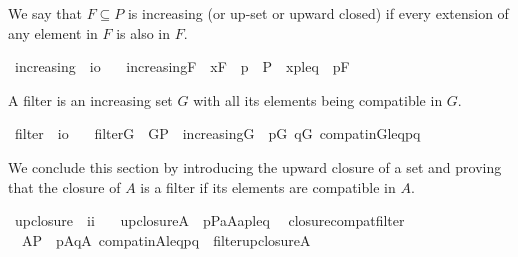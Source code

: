 We say that $F\subseteq P$ is increasing (or up-set or upward closed) if every
extension of any element in $F$ is also in $F$.
\begin{isabelle}
\isamarkupfalse%
\ increasing\ {\isacharcolon}{\isacharcolon}\ {\isachardoublequoteopen}i{\isasymRightarrow}o{\isachardoublequoteclose}\ \isanewline
\ \ {\isachardoublequoteopen}increasing{\isacharparenleft}F{\isacharparenright}\ {\isacharequal}{\isacharequal}\ {\isasymforall}x{\isasymin}F{\isachardot}\ {\isasymforall}\ p\ {\isasymin}\ P\ {\isachardot}\ {\isasymlangle}x{\isacharcomma}p{\isasymrangle}{\isasymin}leq\ {\isasymlongrightarrow}\ p{\isasymin}F{\isachardoublequoteclose}
\end{isabelle}
A filter is an increasing set $G$ with all its elements being compatible in $G$.
\begin{isabelle}
\isamarkupfalse%
\ filter\ {\isacharcolon}{\isacharcolon}\ {\isachardoublequoteopen}i{\isasymRightarrow}o{\isachardoublequoteclose}\ \isanewline
\ \ {\isachardoublequoteopen}filter{\isacharparenleft}G{\isacharparenright}\ {\isacharequal}{\isacharequal}\ G{\isasymsubseteq}P\ {\isasymand}\ increasing{\isacharparenleft}G{\isacharparenright}\ {\isasymand}\ {\isacharparenleft}{\isasymforall}p{\isasymin}G{\isachardot}\ {\isasymforall}q{\isasymin}G{\isachardot}\ compat{\isacharunderscore}in{\isacharparenleft}G{\isacharcomma}leq{\isacharcomma}p{\isacharcomma}q{\isacharparenright}{\isacharparenright}{\isachardoublequoteclose}
\end{isabelle}

We conclude this section by introducing the upward closure of a set
and proving that the closure of $A$ is a filter if its elements are
compatible in $A$.
\begin{isabelle}
\isamarkupfalse%
\ upclosure\ {\isacharcolon}{\isacharcolon}\ {\isachardoublequoteopen}i{\isasymRightarrow}i{\isachardoublequoteclose}\ \isanewline
\ \ {\isachardoublequoteopen}upclosure{\isacharparenleft}A{\isacharparenright}\ {\isacharequal}{\isacharequal}\ {\isacharbraceleft}p{\isasymin}P{\isachardot}{\isasymexists}a{\isasymin}A{\isachardot}{\isasymlangle}a{\isacharcomma}p{\isasymrangle}{\isasymin}leq{\isacharbraceright}{\isachardoublequoteclose}\isanewline
{}\isamarkupfalse%
\ \ closure{\isacharunderscore}compat{\isacharunderscore}filter{\isacharcolon}
\ \ {\isachardoublequoteopen}A{\isasymsubseteq}P\ {\isasymLongrightarrow}\ {\isacharparenleft}{\isasymforall}p{\isasymin}A{\isachardot}{\isasymforall}q{\isasymin}A{\isachardot}\ compat{\isacharunderscore}in{\isacharparenleft}A{\isacharcomma}leq{\isacharcomma}p{\isacharcomma}q{\isacharparenright}{\isacharparenright}\ {\isasymLongrightarrow}\ filter{\isacharparenleft}upclosure{\isacharparenleft}A{\isacharparenright}{\isacharparenright}{\isachardoublequoteclose}
\end{isabelle}



